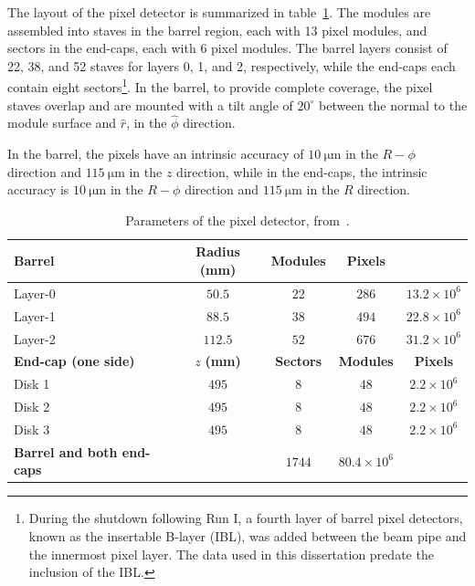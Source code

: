 The layout of the pixel detector is summarized in table~\ref{table:ATLAS-pixel-layout}.  The modules are assembled into staves in the barrel region, each with 13 pixel modules, and sectors in the end-caps, each with 6 pixel modules. The barrel layers consist of 22, 38, and 52 staves for layers 0, 1, and 2, respectively, while the end-caps each contain eight sectors\footnote{During the shutdown following Run I, a fourth layer of barrel pixel detectors, known as the insertable B-layer (IBL), was added between the beam pipe and the innermost pixel layer. The data used in this dissertation predate the inclusion of the IBL.}. In the barrel, to provide complete coverage, the pixel staves overlap and are mounted with a tilt angle of $20^{\circ}$ between the normal to the module surface and $\hat{r}$, in the $\hat{\phi}$ direction. 

In the barrel, the pixels have an intrinsic accuracy of $\SI{10}{\micro\meter}$ in the $R-\phi$ direction and $\SI{115}{\micro\meter}$ in the $z$ direction, while in the end-caps, the intrinsic accuracy is $\SI{10}{\micro\meter}$ in the $R-\phi$ direction and $\SI{115}{\micro\meter}$ in the $R$ direction.

\begin{table}[htbp]
	\centering
	\begin{tabular}{|l|c|c|c|c|}
		\hline
		\textbf{Barrel} & \textbf{Radius (mm)} & \textbf{Modules} & \textbf{Pixels} \\
		\hline
		Layer-0 & $50.5$ & $22$ & $286$ & $13.2\times 10^6$ \\
		Layer-1 & $88.5$ & $38$ & $494$ & $22.8\times 10^6$ \\
		Layer-2 & $112.5$ & $52$ & $676$ & $31.2\times 10^6$ \\
		\hline
		\textbf{End-cap (one side)} & $z$ \textbf{(mm)} & \textbf{Sectors} & \textbf{Modules} & \textbf{Pixels} \\
		\hline
		Disk 1 & $495$ & $8$ & $48$ & $2.2\times 10^6$ \\
		Disk 2 & $495$ & $8$ & $48$ & $2.2\times 10^6$ \\
		Disk 3 & $495$ & $8$ & $48$ & $2.2\times 10^6$ \\
		\hline
		\textbf{Barrel and both end-caps} & & $1744$ & $80.4\times 10^6$ \\
		\hline
	\end{tabular}
	\caption{Parameters of the pixel detector, from~\cite{TheATLASCollaboration:2008fg}.}
	\label{table:ATLAS-pixel-layout}
\end{table}

